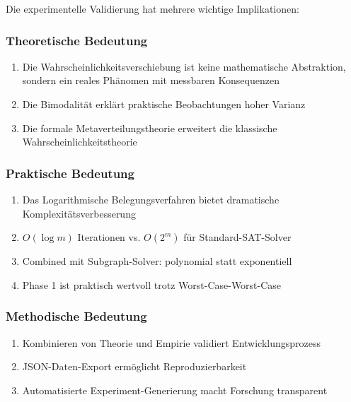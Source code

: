 ﻿\documentclass[a4paper,12pt]{article}
\theoremstyle{definition}
\begin{document}
Die experimentelle Validierung hat mehrere wichtige Implikationen:

\subsubsection*{Theoretische Bedeutung}

\begin{enumerate}
	\item Die Wahrscheinlichkeitsverschiebung ist keine mathematische Abstraktion, sondern
	ein reales Phänomen mit messbaren Konsequenzen
	\item Die Bimodalität erklärt praktische Beobachtungen hoher Varianz
	\item Die formale Metaverteilungstheorie erweitert die klassische Wahrscheinlichkeitstheorie
\end{enumerate}

\subsubsection*{Praktische Bedeutung}

\begin{enumerate}
	\item Das Logarithmische Belegungsverfahren bietet dramatische Komplexitätsverbesserung
	\item $O(\log m)$ Iterationen vs. $O(2^m)$ für Standard-SAT-Solver
	\item Combined mit Subgraph-Solver: polynomial statt exponentiell
	\item Phase 1 ist praktisch wertvoll trotz Worst-Case-Worst-Case
\end{enumerate}

\subsubsection*{Methodische Bedeutung}

\begin{enumerate}
	\item Kombinieren von Theorie und Empirie validiert Entwicklungsprozess
	\item JSON-Daten-Export ermöglicht Reproduzierbarkeit
	\item Automatisierte Experiment-Generierung macht Forschung transparent
\end{enumerate}

\end{document}
